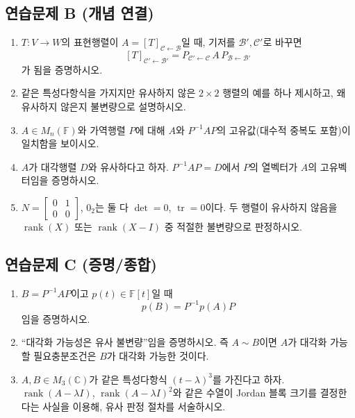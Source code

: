 \subsection*{연습문제 B (개념 연결)}
\begin{enumerate}[label=B\arabic*.]
\item $T:V\to W$의 표현행렬이 $A=[T]_{\mathcal C\leftarrow\mathcal B}$일 때, 기저를 $\mathcal B',\mathcal C'$로 바꾸면
$$
[T]_{\mathcal C'\leftarrow\mathcal B'}=
P_{\mathcal C'\leftarrow\mathcal C}\,A\,P_{\mathcal B\leftarrow\mathcal B'}
$$
가 됨을 증명하시오.
\item 같은 특성다항식을 가지지만 유사하지 않은 $2\times2$ 행렬의 예를 하나 제시하고, 왜 유사하지 않은지 불변량으로 설명하시오.
\item $A\in M_n(\mathbb F)$와 가역행렬 $P$에 대해 $A$와 $P^{-1}AP$의 고유값(대수적 중복도 포함)이 일치함을 보이시오.
\item $A$가 대각행렬 $D$와 유사하다고 하자. $P^{-1}AP=D$에서 $P$의 열벡터가 $A$의 고유벡터임을 증명하시오.
\item $N=\begin{bmatrix}0&1\\0&0\end{bmatrix}$, $0_2$는 둘 다 $\det=0$, $\operatorname{tr}=0$이다. 두 행렬이 유사하지 않음을 $\operatorname{rank}(X)$ 또는 $\operatorname{rank}(X-I)$ 중 적절한 불변량으로 판정하시오.
\end{enumerate}

\subsection*{연습문제 C (증명/종합)}
\begin{enumerate}[label=C\arabic*.]
\item $B=P^{-1}AP$이고 $p(t)\in\mathbb F[t]$일 때
$$
p(B)=P^{-1}p(A)P
$$
임을 증명하시오.
\item ``대각화 가능성은 유사 불변량''임을 증명하시오. 즉 $A\sim B$이면 $A$가 대각화 가능할 필요충분조건은 $B$가 대각화 가능한 것이다.
\item $A,B\in M_3(\mathbb C)$가 같은 특성다항식 $(t-\lambda)^3$를 가진다고 하자. $\operatorname{rank}(A-\lambda I)$, $\operatorname{rank}(A-\lambda I)^2$와 같은 수열이 Jordan 블록 크기를 결정한다는 사실을 이용해, 유사 판정 절차를 서술하시오.
\end{enumerate}